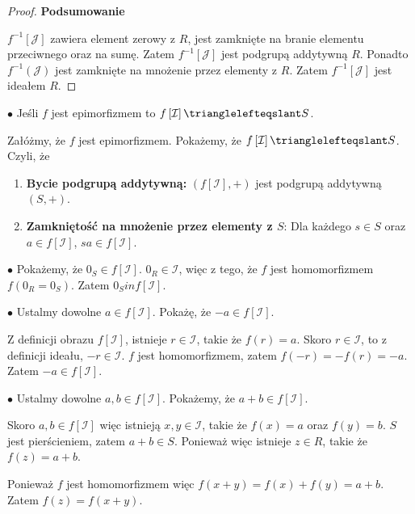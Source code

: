 \begin{solution}
\begin{proof}
		\noindent \textbf{Podsumowanie}

		$f^{-1}\left[ \mathcal{J} \right] $ zawiera element zerowy z $R$, jest zamknięte na branie elementu przeciwnego oraz na sumę. Zatem $f^{-1}\left[ \mathcal{J} \right] $ jest podgrupą addytywną $R$. Ponadto $f^{-1}\left( \mathcal{J} \right) $ jest zamknięte na mnożenie przez elementy z $R$. Zatem $f^{-1}\left[ \mathcal{J} \right]$ jest ideałem $R$.
	\end{proof} 

\noindent$\bullet$ Jeśli $f$ jest epimorfizmem to $f\left[ \mathcal{I} \right] \trianglelefteqslant S$.

Załóżmy, że $f$ jest epimorfizmem. Pokażemy, że $f\left[ \mathcal{I} \right] \trianglelefteqslant S$. Czyli, że
\begin{enumerate}[label=\arabic*.]
	\item \textbf{Bycie podgrupą addytywną:} $\left( f\left[ \mathcal{I} \right] , + \right) $ jest podgrupą addytywną $\left( S, + \right) $.
	\item \textbf{Zamkniętość na mnożenie przez elementy z $S$}: Dla każdego $s \in S$ oraz $a \in f\left[ \mathcal{I} \right]$, $sa  \in f\left[ \mathcal{I} \right]$. 
\end{enumerate}

\noindent$\bullet$ Pokażemy, że $0_{S} \in f\left[ \mathcal{I} \right]$. $0_{R} \in \mathcal{I}$, więc z tego, że $f$ jest homomorfizmem $f\left( 0_{R} = 0_{S} \right)$. Zatem $0_{S} in f\left[ \mathcal{I} \right] $.

\noindent$\bullet$ Ustalmy dowolne $a \in f\left[ \mathcal{I} \right] $. Pokażę, że $-a \in f\left[ \mathcal{I} \right]$. 

Z definicji obrazu $f\left[ \mathcal{I} \right]$, istnieje $r\in \mathcal{I}$, takie że $f\left( r \right) = a$. Skoro $r \in \mathcal{I}$, to z definicji ideału, $-r \in \mathcal{I}$. $f$ jest homomorfizmem, zatem $f\left( -r \right) = -f\left( r \right) = -a$. Zatem $-a \in f\left[ \mathcal{I} \right] $.

\noindent$\bullet$ Ustalmy dowolne $a,b \in f\left[ \mathcal{I} \right] $. Pokażemy, że $a+b \in f\left[ \mathcal{I} \right]$. 

Skoro $a,b \in f\left[ \mathcal{I} \right] $ więc istnieją $x,y \in \mathcal{I}$, takie że $f\left( x \right) = a$ oraz $f\left( y \right) = b$. $S$ jest pierścieniem, zatem $a+b \in S$. Ponieważ więc istnieje $z \in R$, takie że $f\left( z \right) = a + b$.

Ponieważ $f$ jest homomorfizmem więc $f\left( x + y \right) = f\left( x \right) + f\left( y \right) = a + b$. Zatem $f\left( z \right) = f\left( x+y \right) $.


\end{solution}

